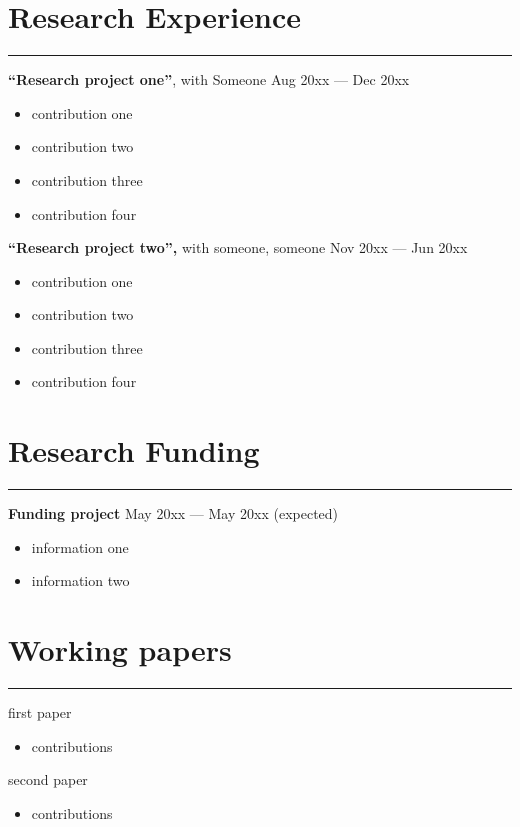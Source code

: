 \documentclass[a4paper,10pt]{article}
\begin{document}
	\section*{Research Experience}
	\hrule
	\vspace{0.2cm}
	\textbf{``Research project one''}, with Someone \hfill Aug 20xx --- Dec 20xx
	\begin{itemize}
		\item contribution one
		\item contribution two
		\item contribution three
		\item contribution four
	\end{itemize}
	\vspace{1em}
	\textbf{``Research project two'',} with someone, someone \hfill Nov 20xx --- Jun 20xx
	\begin{itemize}
		\item contribution one
		\item contribution two
		\item contribution three
		\item contribution four
	\end{itemize}
	
	
	\section*{Research Funding}
	\hrule
	\vspace{0.2cm}
	\textbf{Funding project} \hfill May 20xx --- May 20xx (expected)
	\begin{itemize}
		\item information one
		\item information two
	\end{itemize}
	
	
	\section*{Working papers}
	\hrule
	\vspace{0.2cm}
	first paper
	\begin{itemize}
		\item contributions
	\end{itemize}
	\vspace{1em}
	second paper
	\begin{itemize}
		\item contributions
	\end{itemize}
	
\end{document}

